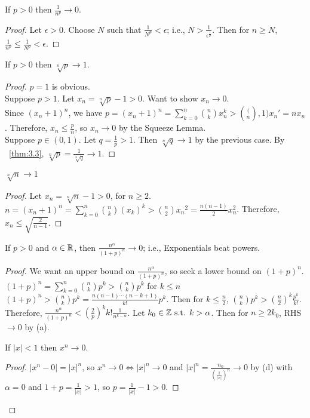 \begin{thm}[20]
	\begin{enumerate}[label=(\alph*)]
		\item If $p>0$ then $\frac{1}{n^{p}} \to 0$.
		      \begin{proof}
			      Let $\epsilon>0$. Choose $N$ such that $\frac{1}{N^{p}} <\epsilon$; i.e., $N>\frac{1}{\epsilon^{\frac{1}{p}}}$. Then for $n\ge N$, $\frac{1}{n^{p}}  \le \frac{1}{N^{p}} <\epsilon$.
		      \end{proof}
		\item If $p>0$ then $\sqrt[n]{p} \to 1$.
		      \begin{proof}
			      $p=1$ is obvious.\\
			      Suppose $p>1$. Let $x_n=\sqrt[n]{p} -1>0$.
			      Want to show $x_n \to 0$.\\
			      Since $(x_n +1)^{n}$, we have $p=(x_n+1)^{n}=\sum_{k=0}^{n}{\binom{n}{k}x_n ^{k}>\binom(n,1) x_n'=nx_n}$. Therefore, $x_n \le  \frac{p}{n}$, so $x_n \to 0$ by the Squeeze Lemma.
			      \\
			      Suppose $p \in (0,1)$. Let $q=\frac{1}{p}>1$. Then $\sqrt[n]{q} \to 1$ by the previous case. By ~\ref{thm:3.3}, $\sqrt[n]{p} = \frac{1}{\sqrt[n]{q}} \to 1$.
		      \end{proof}
		\item $\sqrt[n]{n}\to 1$
		      \begin{proof}
			      Let $x_n=\sqrt[n]{n}-1>0$, for $n\ge 2$.
			      $n=(x_n+1)^{n}=\sum_{k=0}^{n}{\binom{n}{k}(x_k)^{k}}>\binom{n}{2}{x_n}^{2}=\frac{n(n-1)}{2} x_n ^2$. Therefore, $x_n \le \sqrt{\frac{2}{n-1}}$.
		      \end{proof}
		\item If $p>0$ and $\alpha \in \mathbb{R}$, then $\frac{n^{\alpha}}{(1+p)^{n}}\to 0$; i.e., Exponentials beat powers.
		      \begin{proof}
			      We want an upper bound on $\frac{n^{\alpha}}{(1+p)^{n}}$, so seek a lower bound on $(1+p)^{n}$.\\
			      $(1+p)^{n}=\sum_{k=0}^{n}\binom{n}{k}p^{k}>\binom{n}{k}p^{k}$ for $k\le n$\\
			      $(1+p)^{n}>\binom{n}{k}p^{k}=\frac{n(n-1) \cdots (n-k+1)}{k!}p^{k}$.
			      Then for $k \le \frac{n}{2}$,  $\binom{n}{k}p^{k} > (\frac{n}{2})^{k}\frac{p^{k}}{k!}$.
			      Therefore, $\frac{n^{\alpha}}{(1+p)^{n}}<(\frac{2}{p})^{k} k! \frac{1}{n^{k-\alpha}}$. Let $k_0 \in \mathbb{Z} \text{ s.t. } k>\alpha$. Then for $n\ge 2 k_0$, RHS $\to 0$ by (a).
			      \item If $|x| <1 $ then $x^{n}\to 0$.
			      \begin{proof}
				      $|x^{n}-0| = |x|^{n}$, so $x^{n}\to 0 \Leftrightarrow |x|^{n}\to 0$ and $|x|^{n}=\frac{n_0}{(\frac{1}{|x|})^{n}}\to 0$ by (d) with $\alpha=0$ and $1+p=\frac{1}{|x|}>1$, so $p=\frac{1}{|x|}-1>0$.
			      \end{proof}
		      \end{proof}
	\end{enumerate}
\end{thm}


